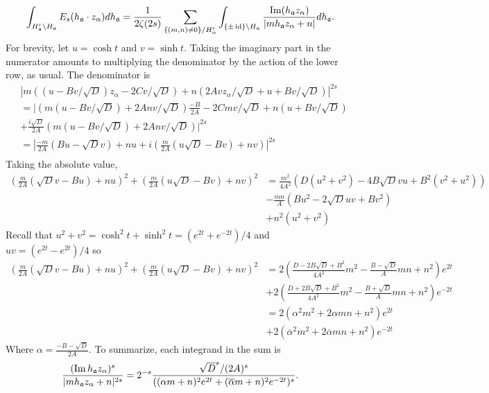 \documentclass[11pt]{amsart}
\begin{document}
\begin{equation*}
\int_{H'_{\mathfrak{a}} \backslash H_{\mathfrak{a}}}E_s(h_{\mathfrak{a}} \cdot z_\alpha) dh_{\mathfrak{a}} =  \frac{1}{2 \zeta (2s)} \sum_{\{ (m,n)\neq 0 \} / H'_\alpha} \int_{\{\pm \operatorname{id} \} \backslash H_{\mathfrak{a}}} \frac{\operatorname{Im}( h_{\mathfrak{a}} z_\alpha)}{|m h_{\mathfrak{a}} z_\alpha+n|} dh_{\mathfrak{a}}.
\end{equation*}
For brevity, let $u=\cosh t$ and $v=\sinh t$. Taking the imaginary part in the numerator amounts to multiplying the denominator by the action of the lower row, as usual. The denominator is
\begin{align*}
&|m((u -B v/\sqrt{D})z_\alpha-2 C v/\sqrt{D} )+n(2Av z_\alpha/\sqrt{D}   +u+B v/\sqrt{D} )|^{2s} \\
 &=|(m(u -B v/\sqrt{D})+2Anv/\sqrt{D})\frac{-B}{2A}-2 C m v/\sqrt{D}+n(u+B v/\sqrt{D})\\
 & +\frac{i\sqrt{D}}{2A}(m(u-Bv/\sqrt{D})+2Anv/\sqrt{D})|^{2s} \\
 &= |\frac{-m}{2A}(Bu-\sqrt{D} v)+nu +i(\frac{m}{2A} (u\sqrt{D}-Bv)+nv)|^{2s} \\
 \end{align*}
 Taking the absolute value,
 \begin{align*}
(\frac{m}{2A}(\sqrt{D} v-Bu)+nu)^2+(\frac{m}{2A} (u\sqrt{D}-Bv)+nv)^2 &= \frac{m^2}{4A^2} (D(u^2+v^2)-4B\sqrt{D} v u + B^2(v^2+u^2))\\
	&- \frac{mn}{A}(Bu^2-2\sqrt{D}uv+B v^2) \\
	&+ n^2(u^2+v^2)
\end{align*}
Recall that $u^2+v^2=\cosh^2 t+\sinh^2 t=(e^{2t}+e^{-2t})/4$ and $uv=(e^{2t}-e^{2t})/4$ so
\begin{align*}
(\frac{m}{2A}(\sqrt{D} v-Bu)+nu)^2+(\frac{m}{2A} (u\sqrt{D}-Bv)+nv)^2 &= 2 (\frac{D-2B\sqrt{D}+B^2}{4A^2}m^2-\frac{B-\sqrt{D}}{A}mn +n^2)e^{2t} \\
&+2 (\frac{D+2B\sqrt{D}+B^2}{4A^2}m^2-\frac{B+\sqrt{D}}{A}mn +n^2)e^{-2t}\\
&=2 (\alpha ^2 m^2 +2 \alpha mn +n^2)e^{2t} \\
&+2 (\overline{\alpha} ^2 m^2 +2 \overline{\alpha} mn +n^2)e^{-2t}
\end{align*}
Where $\alpha=\frac{-B-\sqrt{D}}{2A}$. To summarize, each integrand in the sum is
\begin{align*}
 \frac{(\operatorname{Im} h_{\mathfrak{a}} z_\alpha)^{s}}{|m h_{\mathfrak{a}} z_\alpha+n|^{2s}}=2^{-s}\frac{\sqrt{D}^s/(2A)^s}{((\alpha m +n)^2e^{2t}+(\overline{\alpha} m +n)^2e^{-2t})^s}.
\end{align*}
\end{document}
